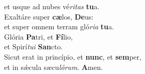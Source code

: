 \oddverse et usque ad nubes vé\textit{ri}\textit{tas} \textbf{tu}a.\\
\evenverse Exaltáre super \textbf{cæ}los, \textbf{De}us:~\*\\
\evenverse et super omnem terram gló\textit{ri}\textit{a} \textbf{tu}a.\\
\oddverse Glória \textbf{Pa}tri, et \textbf{Fí}lio,~\*\\
\oddverse et Spirí\textit{tu}\textit{i} \textbf{San}cto.\\
\evenverse Sicut erat in princípio, et \textbf{nunc}, et \textbf{sem}per,~\*\\
\evenverse et in sǽcula sæcu\textit{ló}\textit{rum}. \textbf{A}men.\\
